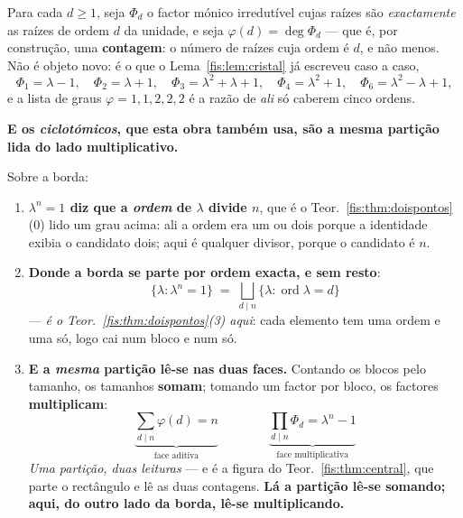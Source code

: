 \documentclass[livro.tex]{subfiles}
\begin{document}
\begin{definicao}\label{fis:def:ciclo}
Para cada $d\ge1$, seja $\Phi_d$ o factor mónico irredutível cujas raízes são
\emph{exactamente} as raízes de ordem $d$ da unidade, e seja
$\varphi(d)=\deg\Phi_d$ --- que é, por construção, uma \textbf{contagem}: o
número de raízes cuja ordem é $d$, e não menos. Não é objeto novo: é o que o
Lema~\ref{fis:lem:cristal} já escreveu caso a caso,
\[
\Phi_1=\lambda-1,\quad \Phi_2=\lambda+1,\quad \Phi_3=\lambda^{2}+\lambda+1,\quad
\Phi_4=\lambda^{2}+1,\quad \Phi_6=\lambda^{2}-\lambda+1,
\]
e a lista de graus $\varphi=1,1,2,2,2$ é a razão de \emph{ali} só caberem cinco
ordens.
\end{definicao}

\medskip\noindent\textbf{E os \emph{ciclotómicos}, que esta obra também usa, são a
mesma partição lida do lado multiplicativo.}

\begin{corolario}\label{fis:cor:ciclo}
Sobre a borda:
\begin{enumerate}\itemsep3pt
\item[(1)] \textbf{$\lambda^{n}=1$ diz que a \emph{ordem} de $\lambda$ divide
$n$}, que é o Teor.~\ref{fis:thm:doispontos}(0) lido um grau acima: ali a ordem era
um ou dois porque a identidade exibia o candidato dois; aqui é qualquer divisor,
porque o candidato é $n$.
\item[(2)] \textbf{Donde a borda se parte por ordem exacta, e sem resto}:
\[
\boxed{\;\{\lambda:\lambda^{n}=1\}\;=\;\bigsqcup_{d\mid n}\{\lambda:\operatorname{ord}\lambda=d\}\;}
\]
--- \emph{é o Teor.~\ref{fis:thm:doispontos}(3) aqui}: cada elemento tem uma ordem
e uma só, logo cai num bloco e num só.
\item[(3)] \textbf{E a \emph{mesma} partição lê-se nas duas faces.} Contando os
blocos pelo tamanho, os tamanhos \textbf{somam}; tomando um factor por bloco, os
factores \textbf{multiplicam}:
\[
\boxed{\;\underbrace{\textstyle\sum_{d\mid n}\varphi(d)=n}_{\text{face aditiva}}
\qquad\qquad
\underbrace{\textstyle\prod_{d\mid n}\Phi_d=\lambda^{n}-1}_{\text{face multiplicativa}}\;}
\]
\emph{Uma partição, duas leituras} --- e é a figura do Teor.~\ref{fis:thm:central},
que parte o rectângulo e lê as duas contagens. \textbf{Lá a partição lê-se somando;
aqui, do outro lado da borda, lê-se multiplicando.}
\end{enumerate}
\end{corolario}
\end{document}
